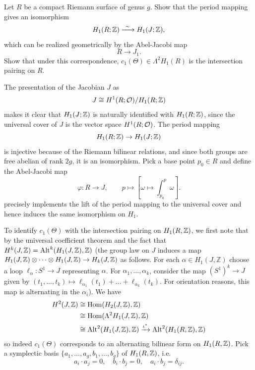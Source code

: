 \documentclass[12pt]{article}
\begin{document}
\begin{exercise}
Let $R$ be a compact Riemann surface of genus $g$.
Show that the period mapping gives an isomorphism
\[
H_1(R;\mathbb{Z})\xrightarrow{\ \sim\ } H_1(J;\mathbb{Z}),
\]
which can be realized geometrically by the Abel-Jacobi map
\[
R\longrightarrow J_1.
\]
Show that under this correspondence, $c_1(\Theta)\in\Lambda^2 H_1(R)$
is the intersection pairing on $R$.
\end{exercise}
\begin{solution}
The presentation of the Jacobian $J$ as
\[
J \cong H^1(R;{\mathcal{O}}) / H_1(R;\mathbb{Z})
\]
makes it clear that $H_1(J;\mathbb{Z})$ is naturally identified with
$H_1(R;\mathbb{Z})$, since the universal cover of $J$ is the vector space
$H^1(R;{\mathcal{O}})$. The period mapping 
\[
H_1(R;\mathbb{Z})\to H_1(J;\mathbb{Z})
\] is injective because of the Riemann bilinear relations, and since both groups are free abelian of rank $2g$, it is an isomorphism. Pick a base point $p_0\in R$ and define the Abel-Jacobi map
\[
\varphi:R\to J,
\qquad
p\mapsto \left[\omega\mapsto \int_{p_0}^p \omega\right].
\]
precisely implements the lift of the period mapping to the universal cover and hence induces the same isomorphism on $H_1$.

To identify $c_1(\Theta)$ with the intersection pairing on $H_1(R,\mathbb{Z})$, we first note that by the universal coefficient theorem and the fact that $H^k(J,\mathbb{Z}) = \operatorname{Alt}^k(H_1(J,\mathbb{Z}),\mathbb{Z})$
(the group law on $J$ induces a map $H_1(J,\mathbb{Z}) \otimes \dots \otimes H_1(J,\mathbb{Z}) \to H_k(J,\mathbb{Z})$ as follows. For each $\alpha\in H_1(J,\mathbb Z)$ choose a loop
$\ell_\alpha: S^1\to J$
representing $\alpha$. For $\alpha_1,\dots, \alpha_k$, consider the map  $(S^1)^k \to J$ given by $(t_1,\dots,t_k) \mapsto \ell_{\alpha_1}(t_1) + \dots + \ell_{\alpha_k}(t_k)$. For orientation reasons, this map is alternating in the $\alpha_i$). We have
\[
\begin{aligned}
H^2(J,\mathbb{Z})
&\cong \operatorname{Hom}(H_2(J,\mathbb{Z}),\mathbb{Z})\\
&\cong \operatorname{Hom}(\Lambda^2 H_1(J,\mathbb{Z}),\mathbb{Z})\\
&\cong \operatorname{Alt}^2(H_1(J,\mathbb{Z}),\mathbb{Z}) \xrightarrow{\iota^*} \operatorname{Alt}^2(H_1(R,\mathbb{Z}),\mathbb{Z})
\end{aligned}
\] so indeed $c_1(\Theta)$ corresponds to an alternating bilinear form on $H_1(R,\mathbb{Z})$. Pick a symplectic basis $\{a_1,\dots,a_g,b_1,\dots,b_g\}$ of $H_1(R,\mathbb{Z})$, i.e.
\[a_i\cdot a_j = 0,
\quad b_i\cdot b_j = 0,
\quad a_i\cdot b_j = \delta_{ij}.\]



\end{solution}
\end{document}
